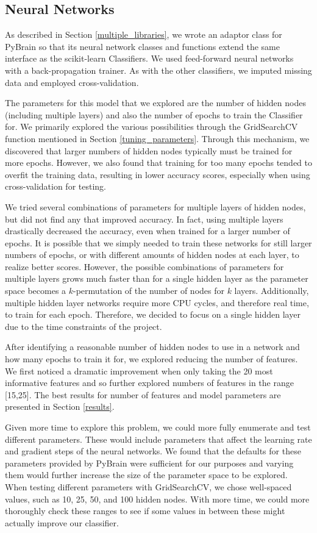 \documentclass{article}
\begin{document}
\subsection{Neural Networks}

As described in Section \ref{multiple_libraries}, we wrote an adaptor class for PyBrain so that its neural network classes and functions extend the same interface as the scikit-learn Classifiers.
We used feed-forward neural networks with a back-propagation trainer.
As with the other classifiers, we imputed missing data and employed cross-validation.

The parameters for this model that we explored are the number of hidden nodes (including multiple layers) and also the number of epochs to train the Classifier for.
We primarily explored the various possibilities through the GridSearchCV function mentioned in Section \ref{tuning_parameters}.
Through this mechanism, we discovered that larger numbers of hidden nodes typically must be trained for more epochs.
However, we also found that training for too many epochs tended to overfit the training data, resulting in lower accuracy scores, especially when using cross-validation for testing.

We tried several combinations of parameters for multiple layers of hidden nodes, but did not find any that improved accuracy.
In fact, using multiple layers drastically decreased the accuracy, even when trained for a larger number of epochs.
It is possible that we simply needed to train these networks for still larger numbers of epochs, or with different amounts of hidden nodes at each layer, to realize better scores.
However, the possible combinations of parameters for multiple layers grows much faster than for a single hidden layer as the parameter space becomes a $k$-permutation of the number of nodes for $k$ layers.
Additionally, multiple hidden layer networks require more CPU cycles, and therefore real time, to train for each epoch.
Therefore, we decided to focus on a single hidden layer due to the time constraints of the project.

After identifying a reasonable number of hidden nodes to use in a network and how many epochs to train it for, we explored reducing the number of features.
We first noticed a dramatic improvement when only taking the 20 most informative features and so further explored numbers of features in the range [15,25].
The best results for number of features and model parameters are presented in Section \ref{results}.

Given more time to explore this problem, we could more fully enumerate and test different parameters.
These would include parameters that affect the learning rate and gradient steps of the neural networks.
We found that the defaults for these parameters provided by PyBrain were sufficient for our purposes and varying them would further increase the size of the parameter space to be explored.
When testing different parameters with GridSearchCV, we chose well-spaced values, such as 10, 25, 50, and 100 hidden nodes.
With more time, we could more thoroughly check these ranges to see if some values in between these might actually improve our classifier.
\end{document}

